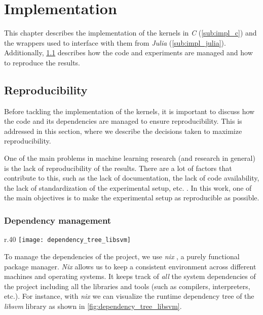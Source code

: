 \chapter{Implementation}
\label{sec:implementation}

This chapter describes the implementation of the kernels in \emph{C}
(\cref{sub:impl_c}) and the wrappers used to interface with them from
\emph{Julia} (\cref{sub:impl_julia}). Additionally, \cref{sec:reproducibility}
describes how the code and experiments are managed and how to reproduce the
results.

\section{Reproducibility}
\label{sec:reproducibility}

Before tackling the implementation of the kernels, it is important to discuss
how the code and its dependencies are managed to ensure reproducibility. This is
addressed in this section, where we describe the decisions taken to maximize
reproducibility.

One of the main problems in machine learning research (and research in general)
is the lack of reproducibility of the results. There are a lot of factors that
contribute to this, such as the lack of documentation, the lack of code
availability, the lack of standardization of the experimental setup, etc.
\cite{alstonBeginnerGuideConducting2021}. In this work, one of the main
objectives is to make the experimental setup as reproducible as possible.

\subsection{Dependency management}%
\label{sub:dependency_management}

\begin{wrapfigure}{r}{.40\textwidth}
    \texttt{[image: dependency\_tree\_libsvm]}
    \caption{\emph{libsvm} runtime dependencies.}
    \label{fig:dependency_tree_libsvm}
\end{wrapfigure}

To manage the dependencies of the project, we use \emph{nix}
\cite{NixNixOSReproducible}, a purely functional package manager. \emph{Nix}
allows us to keep a consistent environment across different machines and
operating systems. It keeps track of \emph{all} the system dependencies of the
project including all the libraries and tools (such as compilers, interpreters,
etc.). For instance, with \emph{nix} we can visualize the runtime dependency
tree of the \emph{libsvm} library as shown in \cref{fig:dependency_tree_libsvm}.

